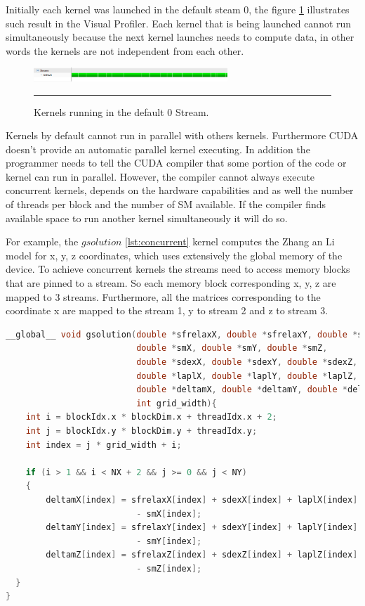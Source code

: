 Initially each kernel was launched in the default steam 0, the figure \ref{fig:streams} illustrates such result in the Visual Profiler. Each kernel that is being launched cannot run simultaneously because the next kernel launches needs to compute data, in other words the kernels are not independent from each other.

\begin{figure}[htbp]
	\centering
		\includegraphics[width=0.65\textwidth]{Figures/ini_steams.png}
		\rule{35em}{0.2pt}
	\caption[Initial Streams]{Kernels running in the default 0 Stream.
}
	\label{fig:streams}
\end{figure}

 Kernels by default cannot run in parallel with others kernels. Furthermore CUDA doesn't provide an automatic parallel kernel executing. In addition the programmer needs to tell the CUDA compiler that some portion of the code or kernel can run in parallel. However, the compiler cannot always execute concurrent kernels, depends on the hardware capabilities and as well the number of threads per block and the number of SM available. If the compiler finds available space to run another kernel simultaneously it will do so. 

For example, the $gsolution$ \ref{lst:concurrent} kernel computes the Zhang an Li model for x, y, z coordinates, which uses extensively the global memory of the device. To achieve concurrent kernels the streams need to access memory blocks that are pinned to a stream. So each memory block corresponding x, y, z are mapped to 3 streams. Furthermore, all the matrices corresponding to the coordinate x are mapped to the stream 1, y to stream 2 and z to stream 3.

\begin{lstlisting}[language=C++, label={lst:concurrent}, caption={Evaluation of x, y, z coordinates of the Zhang and Li model in a single kernel}]
__global__ void gsolution(double *sfrelaxX, double *sfrelaxY, double *sfrelaxZ,
                          double *smX, double *smY, double *smZ,
                          double *sdexX, double *sdexY, double *sdexZ,
                          double *laplX, double *laplY, double *laplZ,
                          double *deltamX, double *deltamY, double *deltamZ,
                          int grid_width){
	int i = blockIdx.x * blockDim.x + threadIdx.x + 2;
  	int j = blockIdx.y * blockDim.y + threadIdx.y;
  	int index = j * grid_width + i;

  	if (i > 1 && i < NX + 2 && j >= 0 && j < NY)
  	{
  		deltamX[index] = sfrelaxX[index] + sdexX[index] + laplX[index]
                          - smX[index];
     	deltamY[index] = sfrelaxY[index] + sdexY[index] + laplY[index]
                          - smY[index];
     	deltamZ[index] = sfrelaxZ[index] + sdexZ[index] + laplZ[index]
                          - smZ[index];
  }
}
\end{lstlisting}
 
